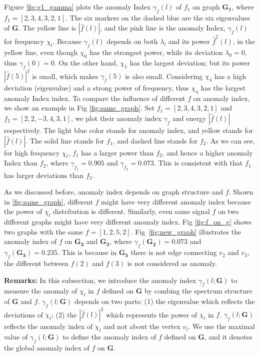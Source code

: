 Figure \ref{fig:g1_gamma} plots the anomaly Index $\gamma_f(l)$ of $f_1$ on graph $\mathbf{G_1}$, where $f_1=[2,3,4,3,2,1]$. The six markers on the dashed blue are the six eigenvalues of $\mathbf{G}$. The yellow line is $|\hat{f}(l)|$, and the pink line is the anomaly Index, $\gamma_f(l)$ for frequency $\chi_l$. Because $\gamma_f(l)$ depends on both $\lambda_l$ and its power $\hat{f}^2(l)$, in the yellow line, even though $\chi_0$ has the strongest power,  while its deviation $\lambda_0 = 0$, thus  $\gamma_f(0)=0$. On the other hand, $\chi_5$ has the largest deviation; but its power $|\hat{f}(5)|^2$ is small, which makes $\gamma_f(5)$ is also small. Considering $\chi_4$ has a high deviation (eigenvalue) and a strong power of frequency, thus $\chi_4$  has the largest anomaly Index index. To compare the influence of different $f$ on anomaly index, we show an example in Fig \ref{fig:same_graph}. Set $f_1=[2,3,4,3,2,1]$ and $f_2=[2,2,-3,4,3,1]$, we plot their anomaly index $\gamma_{f}$ and energy $|\hat{f}(l)|$ respectively.
The light blue color stands for anomaly index, and yellow stands for $|\hat{f}(l)|$. The solid line stands for $f_1$, and dashed line stands for $f_2$. As we can see, for high frequency $\chi_l$, $f_1$ has a larger power than $f_2$, and hence a higher anomaly Index than $f_2$, where $\gamma_{f_1}=0.905$ and $\gamma_{f_2}=0.073$. This is consistent with that $f_1$ has larger deviations than $f_2$.

 As we discussed before, anomaly index depends on graph structure and $f$. Shown in \ref{fig:same_graph}, different $f$ might have very different anomaly index because the power of $\chi_l$ distribution is different. Similarly, even same signal $f$ on two different graphs might have very different anomaly index. Fig \ref{fig:f_on_g} shows two graphs with the same $f=[1,2,5,2]$. Fig~\ref{fig:new_graph} illustrates the anomaly index of $f$ on $\mathbf{G_2}$ and $\mathbf{G_3}$, where $\gamma_{f}(\mathbf{G_2})=0.073$ and $\gamma_{f}(\mathbf{G_3})=0.235$. {This is because in $\mathbf{G_3}$ there is not edge connecting $v_2$ and $v_3$, the different between $f(2)$ and $f(3)$ is not considered as anomaly.}


{\textbf{Remarks:}}
In this subsection, we introduce the anomaly index $\gamma_f(l;\mathbf{G})$ to measure the anomaly of $\chi_l$ in $f$ defined on $\mathbf{G}$ by combing the spectrum structure of $\mathbf{G}$ and $f$. $\gamma_f(l;\mathbf{G})$ depends on two parts: (1) the eigenvalue which reflects the deviations of $\chi_l$; (2) the $|\hat{f}(l)|^2$  which represents the power of $\chi_l$ in $f$. $\gamma_f(l;\mathbf{G})$ reflects the anomaly index of $\chi_l$ and not about the vertex $v_l$. We use the maximal value of $\gamma_f(l;\mathbf{G})$ to define the anomaly index of $f$ defined on $\mathbf{G}$, and it denotes the global anomaly index of $f$ on $\mathbf{G}$.



